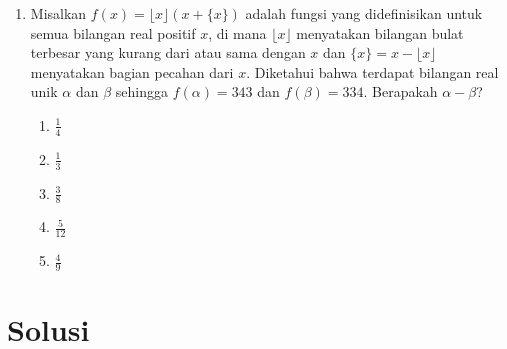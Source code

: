 \documentclass[12pt]{scrartcl}
\begin{document}
\begin{enumerate}
\item Misalkan $f(x)=\lfloor x\rfloor(x+\{x\})$ adalah fungsi yang didefinisikan untuk semua bilangan real positif $x$, di mana $\lfloor x\rfloor$ menyatakan bilangan bulat terbesar yang kurang dari atau sama dengan $x$ dan $\{x\}=x-\lfloor x\rfloor$ menyatakan bagian pecahan dari $x$. Diketahui bahwa terdapat bilangan real unik $\alpha$ dan $\beta$ sehingga $f(\alpha)=343$ dan $f(\beta)=334$. Berapakah $\alpha-\beta$?
\begin{enumerate}
    \item $\frac{1}{4}$
    \item $\frac{1}{3}$
    \item $\frac{3}{8}$
    \item $\frac{5}{12}$
    \item $\frac{4}{9}$
\end{enumerate}

\end{enumerate}

\section*{Solusi}
\end{document}
